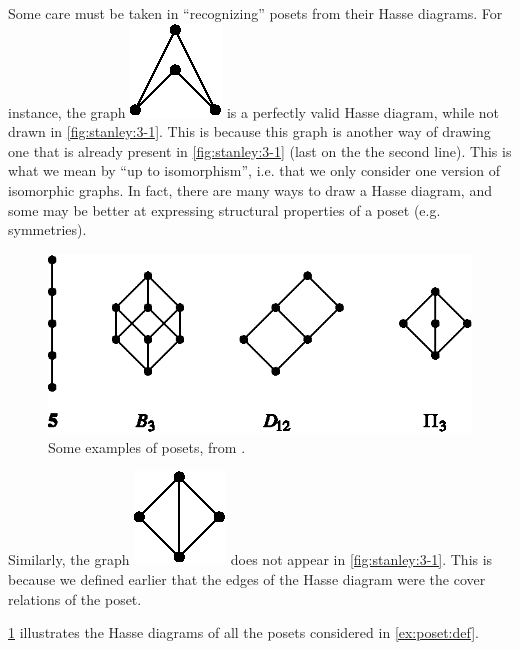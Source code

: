 Some care must be taken in ``recognizing'' posets from their Hasse diagrams.
For instance, the graph \includegraphics{fig/stanley/3-1:a} is a perfectly
valid Hasse diagram, while not drawn in \ref{fig:stanley:3-1}. This is because
this graph is another way of drawing one that is already present in
\ref{fig:stanley:3-1} (last on the the second line).
This is what we mean by ``up to isomorphism'', i.e. that we only consider one
version of isomorphic graphs. In fact, there are many ways to draw a Hasse
diagram, and some may be better at expressing structural properties of a poset
(e.g. symmetries).


\begin{figure}
	\centering
	\includegraphics[height=0.2\textheight]{fig/stanley/3-2}
	\caption{\label{fig:stanley:3-2} Some examples of posets, from
\citet*{Stanley:2011:ECV:2124415}.}
\end{figure}


Similarly, the graph \includegraphics{fig/stanley/3-1:b} does not appear in
\ref{fig:stanley:3-1}.  This is because we defined earlier that the edges of
the Hasse diagram were the cover relations of the poset.


\ref{fig:stanley:3-2} illustrates the Hasse diagrams of all the posets
considered in \ref{ex:poset:def}.

